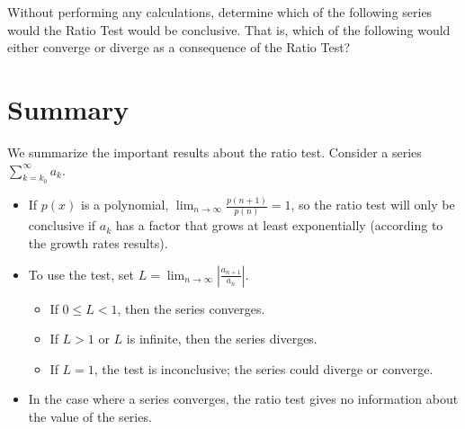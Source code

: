 \documentclass{ximera}
\begin{document}
\begin{image}
  \end{image}

\begin{question}
Without performing any calculations, determine which of the following series would the Ratio Test would be conclusive.  That is, which of the following would either converge or diverge as a consequence of the Ratio Test?
\begin{selectAll}
\end{selectAll}
\end{question}


\section{Summary}
We summarize the important results about the ratio test.  Consider a series $\sum_{k=k_0}^{\infty} a_k$.


\begin{itemize}
\item If $p(x)$ is a polynomial, $\lim_{n \to \infty} \frac{p(n+1)}{p(n)} = 1$, so the ratio test will only be conclusive if $a_k$ has a factor that grows at least exponentially (according to the growth rates results).
\item To use the test, set $L = \lim_{n \to \infty} \left| \frac{a_{n+1}}{a_n} \right|.$ 

\begin{itemize}
  \item If $0 \leq L < 1$, then the series converges.
  \item If $L>1$ or $L$ is infinite, then the series diverges.
  \item If $L = 1$, the test is inconclusive; the series could diverge or converge.
  \end{itemize}

\item In the case where a series converges, the ratio test gives no information about the value of the series.
 \end{itemize}
 
\end{document}
